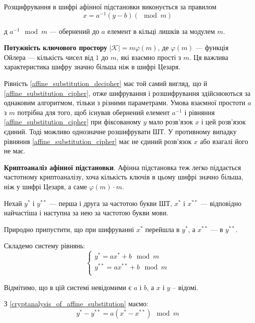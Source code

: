 Розщифрування в шифрі афінної підстановки виконується за правилом
\begin{equation}
    \label{affine_substitution_decipher}
    x = a^{-1} (y-b) (\mod m)
\end{equation}

д $a^{-1} \mod m$ --- обернений до $a$ елемент в кільці лишків за модулем $m$.


\textbf{Потужність ключового простору} $|\mathcal{K}| = m \varphi(m)$, де
$\varphi(m)$ --- функція Ойлера --- кількість чисел
від $1$ до $m$, які взаємно прості з $m$. Ця важлива
характеристика шифру значно більша ніж в шифрі Цезаря.

Рівність \ref{affine_substitution_decipher} має той самий вигляд,
що й \ref{affine_substitution_cipher}, отже шифрування і
розшифрування здійснюються за однаковим алгоритмом, тільки з різними
параметрами. Умова взаємної простоти $a$ з $m$ потрібна для того, щоб існував
обернений елемент $a^{-1}$ і рівняння \ref{affine_substitution_cipher}
при фіксованому $y$ мало розв’язок $x$ і
цей розв’язок єдиний. Тоді можливо однозначне розшифрувати ШТ. У
противному випадку рівняння \ref{affine_substitution_cipher}
має не єдиний розв’язок $x$ або взагалі
його не має.

\textbf{Криптоаналіз афінної підстановки}. Афінна підстановка теж легко
піддається частотному криптоаналізу, хоча кількість ключів в цьому шифрі
значно більша, ніж у шифрі Цезаря, а саме $\varphi(m) \cdot m$.

Нехай $y^{*}$ і $y^{**}$ --- перша і друга за частотою букви ШТ,
$x^{*}$ і $x^{**}$ --- відповідно найчастіша і наступна за нею
за частотою букви мови.

Природно припустити, що при шифруванні $x^{*}$ перейшла в $y^{*}$, а
$x^{**}$ --- в $y^{**}$.

Складемо систему рівнянь:
\begin{equation}
    \label{cryptanalysis_of_affine_substitution}
    \left\{ \begin{array}{l}
        y^{*} = a x^{*} + b \mod m \\
        y^{**} = a x^{**} + b \mod m \\
    \end{array} \right.
\end{equation}

Відмітимо, що в цій системі невідомими є $a$ і $b$, а $x$ і $y$ – відомі.

З \ref{cryptanalysis_of_affine_substitution} маємо:
\begin{equation}
    \label{equation_cryptanalysis_of_affine_substitution}
    y^{*} - y^{**} = a(x^{*} - x^{**}) \mod m
\end{equation}

